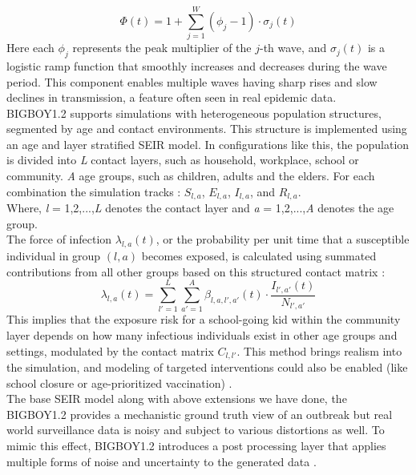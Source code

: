 \documentclass[11pt,a4paper]{article}
\theoremstyle{remark}\newtheorem{remark}{Remark}
\begin{document}
\begin{equation} \label{eq:phi_t}
\Phi(t) = 1 + \sum_{j=1}^{W} (\phi_j - 1) \cdot \sigma_j(t)
\end{equation}
Here each $\phi_j$ represents the peak multiplier of the $j$-th wave, and $\sigma_j(t)$ is a logistic ramp function that smoothly increases and decreases during the wave period. This component enables multiple waves having sharp rises and slow declines in transmission, a feature often seen in real epidemic data. \\
BIGBOY1.2 supports simulations with heterogeneous population structures, segmented by age and contact environments. This structure is implemented using an age and layer stratified SEIR model. In configurations like this, the population is divided into \textit{ L }contact layers, such as household, workplace, school or community. \textit{A} age groups, such as children, adults and the elders. For each combination the simulation tracks : 
$S_{l,a}$, $E_{l,a}$, $I_{l,a}$, and $R_{l,a}$. \\
Where, \textit{l} = 1,2,...,\textit{L} denotes the contact layer and \textit{a} = 1,2,...,\textit{A} denotes the age group. \\
The force of infection $\lambda_{l,a}(t)$, or the probability per unit time that a susceptible individual in group $(l,a)$ becomes exposed, is calculated using summated contributions from all other groups based on this structured contact matrix \cite{prem2017projecting}:
\begin{equation} \label{eq:force_of_infection}
\lambda_{l,a}(t) = \sum_{l'=1}^{L} \sum_{a'=1}^{A} \beta_{l,a,l',a'}(t) \cdot \frac{I_{l',a'}(t)}{N_{l',a'}}
\end{equation}
This implies that the exposure risk for a school-going kid within the community layer depends on how many infectious individuals exist in other age groups and settings, modulated by the contact matrix $C_{l,l'}$. This method brings realism into the simulation, and modeling of targeted interventions could also be enabled (like school closure or age-prioritized vaccination) \cite{bubar2021model}. \\
The base SEIR model along with above extensions we have done, the BIGBOY1.2 provides a mechanistic ground truth view of an outbreak but real world surveillance data is noisy and subject to various distortions as well. To mimic this effect, BIGBOY1.2 introduces a post processing layer that applies multiple forms of noise and uncertainty to the generated data \cite{gostic2020}. \\
\end{document}
